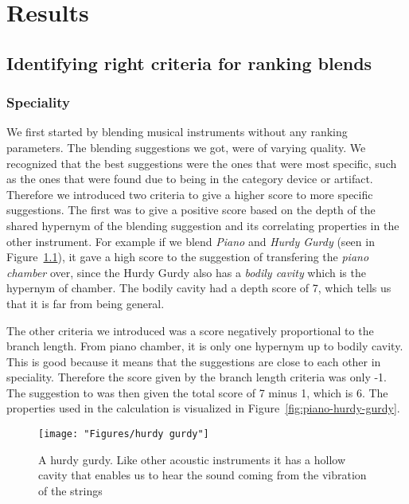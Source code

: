 
\chapter{Results} %

\label{Chapter6} %


\section{Identifying right criteria for ranking blends}

\subsection{Speciality}
We first started by blending musical instruments without any ranking parameters. The blending suggestions we got, were of varying quality. We recognized that the best suggestions were the ones that were most specific, such as the ones that were found due to being in the category device or artifact. Therefore we introduced two criteria to give a higher score to more specific suggestions. The first was to give a positive score based on the depth of the shared hypernym of the blending suggestion and its correlating properties in the other instrument. For example if we blend \emph{Piano} and \emph{Hurdy Gurdy} (seen in Figure~\ref{fig:hurdy-gurdy}), it gave a high score to the suggestion of transfering the \emph{piano chamber} over, since the Hurdy Gurdy also has a \emph{bodily cavity} which is the hypernym of chamber. The bodily cavity had a depth score of 7, which tells us that it is far from being general.

The other criteria we introduced was a score negatively proportional to the branch length. From piano chamber, it is only one hypernym up to bodily cavity. This is good because it means that the suggestions are close to each other in speciality. Therefore the score given by the branch length criteria was only -1. The suggestion to was then given the total score of 7 minus 1, which is 6. The properties used in the calculation is visualized in Figure~\ref{fig:piano-hurdy-gurdy}.

\begin{figure}
\centering
\texttt{[image: "Figures/hurdy gurdy"]}
\caption{A hurdy gurdy. Like other acoustic instruments it has a hollow cavity that enables us to hear the sound coming from the vibration of the strings}
\label{fig:hurdy-gurdy}
\end{figure}

